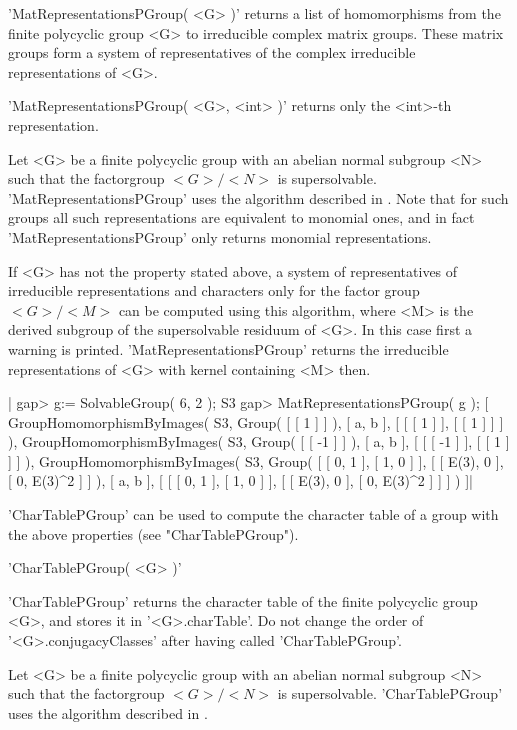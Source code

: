 'MatRepresentationsPGroup( <G> )' returns a list of homomorphisms from
the finite polycyclic group <G> to irreducible complex matrix groups.
These matrix groups form a system of representatives of the complex
irreducible representations of <G>.

'MatRepresentationsPGroup( <G>, <int> )' returns only the <int>-th
representation.

Let <G> be a finite polycyclic group with an abelian  normal subgroup <N>
such   that    the   factorgroup    $<G>   /   <N>$   is   supersolvable.
'MatRepresentationsPGroup' uses the algorithm  described in \cite{Bau91}.
Note  that for  such  groups all  such representations are equivalent  to
monomial  ones,  and  in  fact  'MatRepresentationsPGroup'  only  returns
monomial representations.

If <G> has not the property stated above, a system of representatives of
irreducible representations and characters only for the factor group
$<G> / <M>$ can be computed using this algorithm, where <M> is the
derived subgroup of the supersolvable residuum of <G>.  In this case
first a warning is printed.  'MatRepresentationsPGroup' returns
the irreducible representations of <G> with kernel containing <M> then.

|    gap> g:= SolvableGroup( 6, 2 );
    S3
    gap> MatRepresentationsPGroup( g );
    [ GroupHomomorphismByImages( S3, Group( [ [ 1 ] ] ), [ a, b ],
        [ [ [ 1 ] ], [ [ 1 ] ] ] ), GroupHomomorphismByImages( S3, Group(
        [ [ -1 ] ] ), [ a, b ], [ [ [ -1 ] ], [ [ 1 ] ] ] ),
      GroupHomomorphismByImages( S3, Group( [ [ 0, 1 ], [ 1, 0 ] ],
        [ [ E(3), 0 ], [ 0, E(3)^2 ] ] ), [ a, b ],
        [ [ [ 0, 1 ], [ 1, 0 ] ], [ [ E(3), 0 ], [ 0, E(3)^2 ] ] ] ) ]|

'CharTablePGroup' can be used to compute the character table of a group
with the above properties (see "CharTablePGroup").

%

'CharTablePGroup( <G> )'

'CharTablePGroup' returns the character table of the finite polycyclic
group <G>, and stores it in '<G>.charTable'.  Do not change the order of
'<G>.conjugacyClasses' after having called 'CharTablePGroup'.

Let <G> be a finite polycyclic group with an abelian normal subgroup <N>
such that the factorgroup $<G> / <N>$ is supersolvable.
'CharTablePGroup' uses the algorithm described in \cite{Bau91}.

